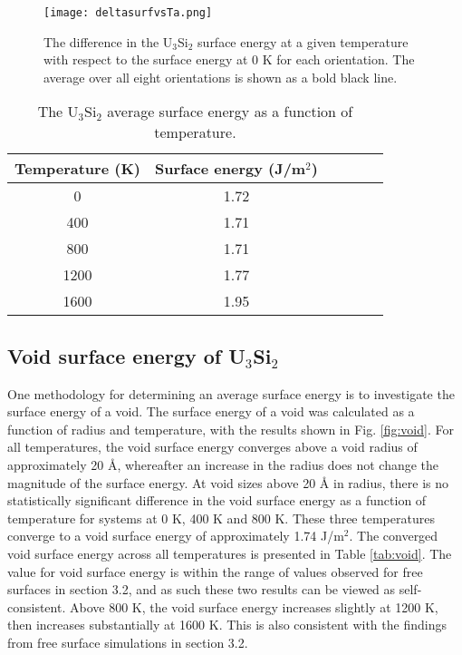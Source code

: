\documentclass[review]{elsarticle}
\begin{document}
\begin{figure}[h]
 \centering
 \texttt{[image: deltasurfvsTa.png]} 
 \caption{The difference in the U$_{3}$Si$_{2}$ surface energy at a given temperature with respect to the surface energy at 0 K for each orientation. The average over all eight orientations is shown as a bold black line. }
 \label{fig:deltasurf}
\end{figure}

\begin{table}[h]
\caption{The U$_{3}$Si$_{2}$ average surface energy as a function of temperature.} \label{tab:surf}
\begin{center}
\begin{tabular}{|c|c|c|c|c|c|}
	\hline
	Temperature (K) & Surface energy (J/m$^{2}$)\\
	 \hline
	 0 & 1.72	  \\
	 400 & 1.71  \\
	 800 & 1.71	  \\
	 1200 & 1.77  \\
	 1600 & 1.95  \\
	 \hline
\end{tabular}
\end{center}
\label{default}
\end{table}

\FloatBarrier

\subsection{Void surface energy of U$_{3}$Si$_{2}$}

One methodology for determining an average surface energy is to investigate the surface energy of a void. The surface energy of a void was calculated as a function of radius and temperature, with the results shown in Fig. \ref{fig:void}. For all temperatures, the void surface energy converges above a void radius of approximately 20 {\AA}, whereafter an increase in the radius does not change the magnitude of the surface energy. At void sizes above 20 {\AA} in radius, there is no statistically significant difference in the void surface energy as a function of temperature for systems at 0 K, 400 K and 800 K. These three temperatures converge to a void surface energy of approximately 1.74 J/m$^{2}$. The converged void surface energy across all temperatures is presented in Table \ref{tab:void}. The value for void surface energy is within the range of values observed for free surfaces in section 3.2, and as such these two results can be viewed as self-consistent. Above 800 K, the void surface energy increases slightly at 1200 K, then increases substantially at 1600 K. This is also consistent with the findings from free surface simulations in section 3.2. 
\end{document}
